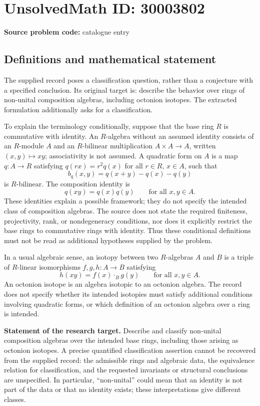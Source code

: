 \documentclass[11pt]{article}
\begin{document}
\section*{UnsolvedMath ID: 30003802}
\textbf{Source problem code:} catalogue entry
\subsection{Definitions and mathematical statement}
The supplied record poses a classification question, rather than a conjecture with a specified conclusion. Its original target is: describe the behavior over rings of non-unital composition algebras, including octonion isotopes. The extracted formulation additionally asks for a classification.

To explain the terminology conditionally, suppose that the base ring \(R\) is commutative with identity. An \(R\)-algebra without an assumed identity consists of an \(R\)-module \(A\) and an \(R\)-bilinear multiplication \(A\times A\to A\), written \((x,y)\mapsto xy\); associativity is not assumed. A quadratic form on \(A\) is a map \(q\colon A\to R\) satisfying \(q(rx)=r^2q(x)\) for all \(r\in R\), \(x\in A\), such that
\[
 b_q(x,y)=q(x+y)-q(x)-q(y)
\]
is \(R\)-bilinear. The composition identity is
\[
 q(xy)=q(x)q(y)\qquad\text{for all }x,y\in A.
\]
These identities explain a possible framework; they do not specify the intended class of composition algebras. The source does not state the required finiteness, projectivity, rank, or nondegeneracy conditions, nor does it explicitly restrict the base rings to commutative rings with identity. Thus these conditional definitions must not be read as additional hypotheses supplied by the problem.

In a usual algebraic sense, an isotopy between two \(R\)-algebras \(A\) and \(B\) is a triple of \(R\)-linear isomorphisms \(f,g,h\colon A\to B\) satisfying
\[
 h(xy)=f(x)\mathbin{\cdot_B}g(y)\qquad\text{for all }x,y\in A.
\]
An octonion isotope is an algebra isotopic to an octonion algebra. The record does not specify whether its intended isotopies must satisfy additional conditions involving quadratic forms, or which definition of an octonion algebra over a ring is intended.

\textbf{Statement of the research target.} Describe and classify non-unital composition algebras over the intended base rings, including those arising as octonion isotopes. A precise quantified classification assertion cannot be recovered from the supplied record: the admissible rings and algebraic data, the equivalence relation for classification, and the requested invariants or structural conclusions are unspecified. In particular, ``non-unital'' could mean that an identity is not part of the data or that no identity exists; these interpretations give different classes.
\end{document}
